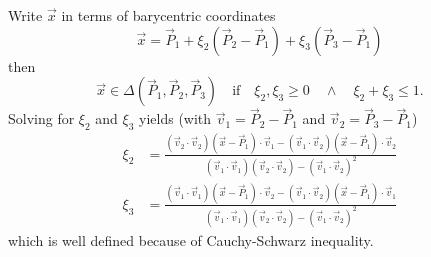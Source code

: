 Write $\vec{x}$ in terms of barycentric coordinates 
\begin{equation*}
	\vec{x} = \vec{P}_1+\xi_2(\vec{P}_2-\vec{P}_1)+\xi_3(\vec{P}_3-\vec{P}_1)
\end{equation*}
then
\begin{equation*}
	\vec{x}\in \Delta(\vec{P}_1,\vec{P}_2,\vec{P}_3)\quad\text{if}\quad \xi_2,\xi_3\geq 0 \quad\wedge \quad\xi_2+\xi_3 \leq 1.
\end{equation*}
Solving for $\xi_2$ and $\xi_3$ yields (with $\vec{v}_1 = \vec{P}_2-\vec{P}_1$ and $\vec{v}_2 = \vec{P}_3-\vec{P}_1$)
\begin{align*}
	\xi_2 &= \frac{(\vec{v}_2\cdot\vec{v}_2)(\vec{x}-\vec{P}_1)\cdot\vec{v}_1-(\vec{v}_1\cdot\vec{v}_2)(\vec{x}-\vec{P}_1)\cdot\vec{v}_2}{(\vec{v}_1\cdot\vec{v}_1)(\vec{v}_2\cdot\vec{v}_2)-(\vec{v}_1\cdot\vec{v}_2)^2}\\
	\xi_3 &= \frac{(\vec{v}_1\cdot\vec{v}_1)(\vec{x}-\vec{P}_1)\cdot\vec{v}_2-(\vec{v}_1\cdot\vec{v}_2)(\vec{x}-\vec{P}_1)\cdot\vec{v}_1}{(\vec{v}_1\cdot\vec{v}_1)(\vec{v}_2\cdot\vec{v}_2)-(\vec{v}_1\cdot\vec{v}_2)^2}
\end{align*}
which is well defined because of Cauchy-Schwarz inequality. 

